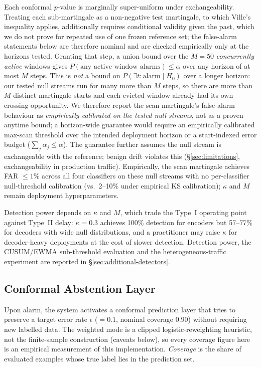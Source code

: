 \documentclass{article}
\begin{document}
Each conformal $p$-value is marginally super-uniform under exchangeability. Treating each sub-martingale as a non-negative test martingale, to which Ville's inequality applies, additionally requires conditional validity given the past, which we do not prove for repeated use of one frozen reference set; the false-alarm statements below are therefore nominal and are checked empirically only at the horizons tested. Granting that step, a union bound over the $M = 50$ \emph{concurrently active} windows gives $P(\text{any active window alarms}) \leq \alpha$ over any horizon of at most $M$ steps. This is \emph{not} a bound on $P(\exists t: \text{alarm} \mid H_0)$ over a longer horizon: our tested null streams run for many more than $M$ steps, so there are more than $M$ distinct martingale starts and each evicted window already had its own crossing opportunity. We therefore report the scan martingale's false-alarm behaviour as \emph{empirically calibrated on the tested null streams}, not as a proven anytime bound; a horizon-wide guarantee would require an empirically calibrated max-scan threshold over the intended deployment horizon or a start-indexed error budget ($\sum_j \alpha_j \leq \alpha$). The guarantee further assumes the null stream is exchangeable with the reference; benign drift violates this (\S\ref{sec:limitations}, exchangeability in production traffic). Empirically, the scan martingale achieves FAR $\leq 1\%$ across all four classifiers on these null streams with no per-classifier null-threshold calibration (vs.\ 2--10\% under empirical KS calibration); $\kappa$ and $M$ remain deployment hyperparameters.

Detection power depends on $\kappa$ and $M$, which trade the Type~I operating point against Type~II delay: $\kappa = 0.3$ achieves 100\% detection for encoders but 57--77\% for decoders with wide null distributions, and a practitioner may raise $\kappa$ for decoder-heavy deployments at the cost of slower detection. Detection power, the CUSUM/EWMA sub-threshold evaluation and the heterogeneous-traffic experiment are reported in \S\ref{sec:additional-detectors}.

\subsection{Conformal Abstention Layer}
\label{sec:conformal}

Upon alarm, the system activates a conformal prediction layer that tries to preserve a target error rate $\epsilon$ ($=0.1$, nominal coverage $0.90$) without requiring new labelled data. The weighted mode is a clipped logistic-reweighting heuristic, not the finite-sample construction (caveats below), so every coverage figure here is an empirical measurement of this implementation. \emph{Coverage} is the share of evaluated examples whose true label lies in the prediction set.
\end{document}

